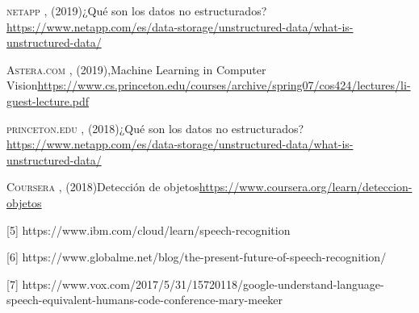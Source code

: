 \documentclass[twocolumn]{article}
\begin{document}
\begin{thebibliography}{X}
  
  
   \textsc{netapp} ,
  \textit{}(2019)¿Qué son los datos no estructurados?\url{https://www.netapp.com/es/data-storage/unstructured-data/what-is-unstructured-data/}
  
   \textsc{Astera.com} ,
  \textit{}(2019),Machine Learning in Computer Vision\url{https://www.cs.princeton.edu/courses/archive/spring07/cos424/lectures/li-guest-lecture.pdf}


   \textsc{princeton.edu} ,
  \textit{}(2018)¿Qué son los datos no estructurados?\url{https://www.netapp.com/es/data-storage/unstructured-data/what-is-unstructured-data/}
  
   \textsc{Coursera} ,
  \textit{}(2018)Detección de objetos\url{https://www.coursera.org/learn/deteccion-objetos}

  [5] https://www.ibm.com/cloud/learn/speech-recognition

  [6] https://www.globalme.net/blog/the-present-future-of-speech-recognition/

  [7] https://www.vox.com/2017/5/31/15720118/google-understand-language-speech-equivalent-humans-code-conference-mary-meeker



\end{thebibliography}
\end{document}
